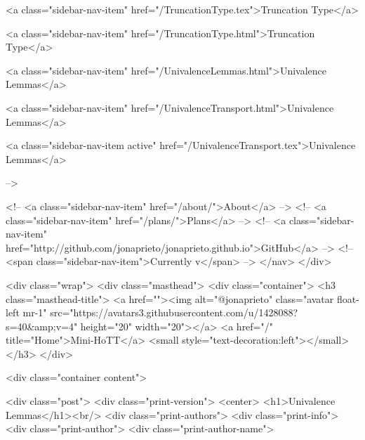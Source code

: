      
    
      
        
          <a class="sidebar-nav-item" href="/TruncationType.tex">Truncation Type</a>
        
      
    
      
        
          <a class="sidebar-nav-item" href="/TruncationType.html">Truncation Type</a>
        
      
    
      
        
          <a class="sidebar-nav-item" href="/UnivalenceLemmas.html">Univalence Lemmas</a>
        
      
    
      
        
          <a class="sidebar-nav-item" href="/UnivalenceTransport.html">Univalence Lemmas</a>
        
      
    
      
        
          <a class="sidebar-nav-item active" href="/UnivalenceTransport.tex">Univalence Lemmas</a>
        
      
     -->

    <!-- <a class="sidebar-nav-item" href="/about/">About</a> -->
    <!-- <a class="sidebar-nav-item" href="/plans/">Plans</a> -->
    <!-- <a class="sidebar-nav-item" href="http://github.com/jonaprieto/jonaprieto.github.io">GitHub</a> -->
    <!-- <span class="sidebar-nav-item">Currently v</span> -->
  </nav>
</div>

    <div class="wrap">
      <div class="masthead">
        <div class="container">
          <h3 class="masthead-title">
            <a href=""><img alt="@jonaprieto" class="avatar float-left mr-1" src="https://avatars3.githubusercontent.com/u/1428088?s=40&amp;v=4" height="20" width="20"></a>
            <a href="/" title="Home">Mini-HoTT</a>
            <small style="text-decoration:left"></small>
          </h3>
        </div>
      
      <div class="container content">
        







<div class="post">
  <div class="print-version">
    <center>
      <h1>Univalence Lemmas</h1><br/>
        <div class="print-authors">
          <div class="print-info">
            <div class="print-author">
              <div class="print-author-name">
                
